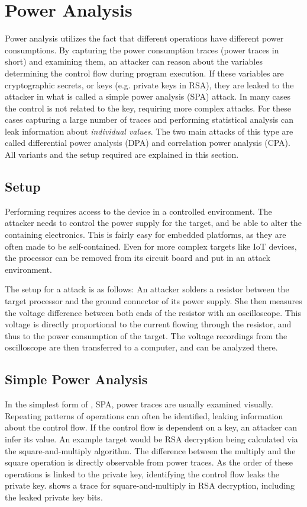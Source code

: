 \chapter{Power Analysis}
\label{poweranalysis}
Power analysis utilizes the fact that different operations have different power consumptions.
By capturing the power consumption traces (power traces in short) and examining them, an attacker can reason about the variables determining the control flow during program execution.
If these variables are cryptographic secrets, or keys (e.g. private keys in RSA), they are leaked to the attacker in what is called a simple power analysis (SPA) attack\cite{kocher1999differential}.
In many cases the control is not related to the key, requiring more complex attacks.
For these cases capturing a large number of traces and performing statistical analysis can leak information about \emph{individual values}.
The two main attacks of this type are called differential power analysis (DPA)\cite{kocher1999differential} and correlation power analysis (CPA)\cite{brier2004correlation}.
All variants and the setup required are explained in this section.

\section{Setup}
Performing \poweranalysis{} requires access to the device in a controlled environment.
The attacker needs to control the power supply for the target, and be able to alter the containing electronics.
This is fairly easy for embedded platforms, as they are often made to be self-contained.
Even for more complex targets like IoT devices, the processor can be removed from its circuit board and put in an attack environment\cite{ronen2017iot}.

The setup for a \poweranalysis{} attack is as follows:
An attacker solders a resistor between the target processor and the ground connector of its power supply.
She then measures the voltage difference between both ends of the resistor with an oscilloscope.
This voltage is directly proportional to the current flowing through the resistor, and thus to the power consumption of the target.
The voltage recordings from the oscilloscope are then transferred to a computer, and can be analyzed there.

\section{Simple Power Analysis}
In the simplest form of \poweranalysis{}, SPA, power traces are usually examined visually.
Repeating patterns of operations can often be identified, leaking information about the control flow.
If the control flow is dependent on a key, an attacker can infer its value.
An example target would be RSA decryption being calculated via the square-and-multiply algorithm.
The difference between the multiply and the square operation is directly observable from power traces.
As the order of these operations is linked to the private key, identifying the control flow leaks the private key.
 shows a trace for square-and-multiply in RSA decryption, including the leaked private key bits.

